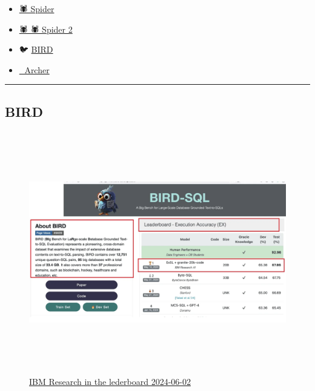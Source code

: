 \documentclass[
  letterpaper,
  DIV=11,
  numbers=noendperiod]{scrartcl}
\providecommand{\tightlist}{%
  \setlength{\itemsep}{0pt}\setlength{\parskip}{0pt}}
\begin{document}
\begin{itemize}
\tightlist
\item
  \href{https://yale-lily.github.io/spider}{🕷️ Spider}
\end{itemize}

\begin{itemize}
\tightlist
\item
  \href{https://spider2-sql.github.io/}{🕷️ 🕷️ Spider 2}
\end{itemize}

\begin{itemize}
\tightlist
\item
  🐦 \href{https://bird-bench.github.io/}{BIRD}
\end{itemize}

\begin{itemize}
\tightlist
\item
  \href{https://sig4kg.github.io/archer-bench/}{🏹 Archer}
\end{itemize}

\begin{center}\rule{0.5\linewidth}{0.5pt}\end{center}

\subsection{BIRD}\label{bird}

\begin{figure}[H]

{\centering \includegraphics[width=\linewidth,height=4.16667in,keepaspectratio]{./img/ibm-granite-leaderboard.png}

}

\caption{\href{https://research.ibm.com/blog/granite-LLM-text-to-SQL}{IBM
Research in the lederboard 2024-06-02}}

\end{figure}%
\end{document}
